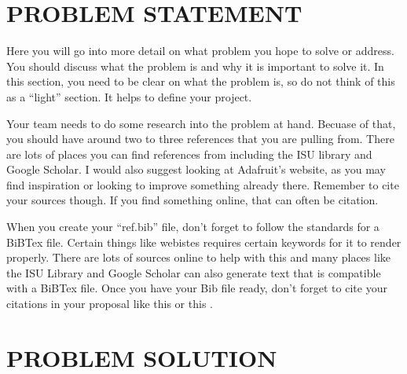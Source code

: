 \documentclass[12pt]{article}
\begin{document}

\section{PROBLEM STATEMENT}
Here you will go into more detail on what problem you hope to solve or address.  You should discuss what the problem is and why it is important to solve it. In this section, you need to be clear on what the problem is, so do not think of this as a ``light'' section. It helps to define your project.

Your team needs to do some research into the problem at hand. Becuase of that, you should have around two to three references that you are pulling from. There are lots of places you can find references from including the ISU library and Google Scholar. I would also suggest looking at Adafruit's website, as you may find inspiration or looking to improve something already there. Remember to cite your sources though. If you find something online, that can often be citation.

When you create your ``ref.bib'' file, don't forget to follow the standards for a BiBTex file. Certain things like webistes requires certain keywords for it to render properly. There are lots of sources online to help with this and many places like the ISU Library and Google Scholar can also generate text that is compatible with a BiBTex file. Once you have your Bib file ready, don't forget to cite your citations in your proposal like this \cite{einstein} or this \cite{dirac}.
 
\newpage

\section{PROBLEM SOLUTION}
\end{document}
